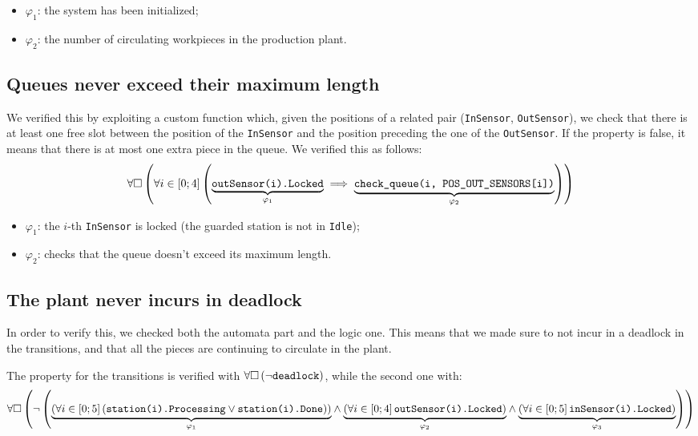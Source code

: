 \documentclass[a4paper]{article}
\newcommand{\formulacomment}[2]{\underset{\varphi_{#1}}{\underbrace{#2}}}
\newcommand{\formulatext}[1]{\text{\texttt{#1}}}
\begin{document}
    \begin{itemize}
        \item \(\varphi_1\): the system has been initialized;
        \item \(\varphi_2\): the number of circulating workpieces in the production plant.
    \end{itemize}

    \subsection{Queues never exceed their maximum length} \label{property:3}

    We verified this by exploiting a custom function which, given the positions of a related pair (\texttt{InSensor}, \texttt{OutSensor}), we check that there is at least one free slot between the position of the \texttt{InSensor} and the position preceding the one of the \texttt{OutSensor}. If the property is false, it means that there is at most one extra piece in the queue. We verified this as follows:
    \[\forall \square \left(\forall i \in \left[0; 4\right] \left(\formulacomment{1}{\formulatext{outSensor(i).Locked}} \implies \formulacomment{2}{\formulatext{check\_queue(i, POS\_OUT\_SENSORS[i])}}\right)\right)\]

    \begin{itemize}
        \item \(\varphi_1\): the \(i\)-th \texttt{InSensor} is locked (the guarded station is not in \texttt{Idle});
        \item \(\varphi_2\): checks that the queue doesn't exceed its maximum length.
    \end{itemize}

    \subsection{The plant never incurs in deadlock} \label{property:4}

    In order to verify this, we checked both the automata part and the logic one. This means that we made sure to not incur in a deadlock in the transitions, and that all the pieces are continuing to circulate in the plant.\medskip

    The property for the transitions is verified with \(\forall \square \left(\neg \formulatext{deadlock}\right)\), while the second one with:
    {
        \scriptsize
        \[\forall \square \left(\neg \left(\formulacomment{1}{\left(\forall i \in \left[0; 5\right] \left(\formulatext{station(i).Processing} \vee \formulatext{station(i).Done}\right)\right)} \wedge \formulacomment{2}{\left(\forall i \in \left[0; 4\right] \formulatext{outSensor(i).Locked}\right)} \wedge \formulacomment{3}{\left(\forall i \in \left[0; 5\right] \formulatext{inSensor(i).Locked}\right)}\right)\right)\]
    }
\end{document}
